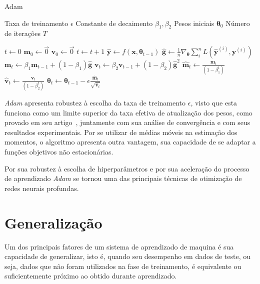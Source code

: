 \begin{algorithm}
    \caption{Adam}
    \label{al:adam}
    \begin{algorithmic}[1]
        \Require Taxa de treinamento $\epsilon$
        \Require Constante de decaimento $\beta_{1}, \beta_{2}$
        \Require Pesos iniciais $\boldsymbol{\theta}_{0}$
        \Require Número de iterações $T$

        \State $t \gets 0$
        \State $\mathbf{m}_{0} \gets \vec{0}$
        \State $\mathbf{v}_{0} \gets \vec{0}$
            \State $t \gets t + 1$
            \State $\mathbf{\hat{y}} \gets f(\mathbf{x}, \boldsymbol{\theta}_{t-1})$
            \State $\mathbf{\hat{g}} \gets \frac{1}{n} \nabla_{\boldsymbol{\theta}} \sum_i^n L(\mathbf{\hat{y}}^{(i)}, \mathbf{y}^{(i)})$
            \State $\mathbf{m}_{t} \gets \beta_{1} \mathbf{m}_{t-1} + (1 - \beta_{1}) \mathbf{\hat{g}}$
            \State $\mathbf{v}_{t} \gets \beta_{2} \mathbf{v}_{t-1} + (1 - \beta_{2}) \mathbf{\hat{g}}^{2}$
            \State $\mathbf{\hat{m}}_{t} \gets \frac{\mathbf{m}_{t}}{(1 - \beta_{1}^{t})}$
            \State $\mathbf{\hat{v}}_{t} \gets \frac{\mathbf{v}_{t}}{(1 - \beta_{2}^{t})}$
            \State $\boldsymbol{\theta}_{t} \gets \boldsymbol{\theta}_{t-1} - \epsilon \frac{\mathbf{\hat{m}}_{t}}{\sqrt{\mathbf{\hat{v}}_{t}}} $
        \EndWhile
    \end{algorithmic}
\end{algorithm}

\textit{Adam} apresenta robustez à escolha da taxa de treinamento $\epsilon$, visto que esta funciona como um limite superior da taxa efetiva de atualização dos pesos, como provado em seu artigo~\cite{kingma14}, juntamente com sua análise de convergência e com seus resultados experimentais. Por se utilizar de médias móveis na estimação dos momentos, o algoritmo apresenta outra vantagem, sua capacidade de se adaptar a funções objetivos não estacionárias.

Por sua robustez à escolha de hiperparâmetros e por sua aceleração do processo de aprendizado \textit{Adam} se tornou uma das principais técnicas de otimização de redes neurais profundas.

\section{Generalização} \label{sec:generalizacao}

Um dos principais fatores de um sistema de aprendizado de maquina é sua capacidade de generalizar, isto é, quando seu desempenho em dados de teste, ou seja, dados que não foram utilizados na fase de treinamento, é equivalente ou suficientemente próximo ao obtido durante aprendizado.

